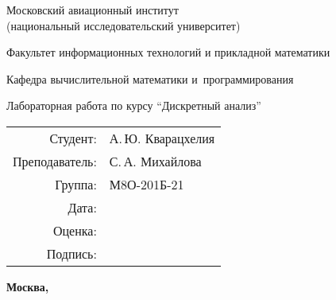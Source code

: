 \begin{titlepage}
\begin{center}
\bfseries

{\Large Московский авиационный институт\\ (национальный исследовательский университет)

}

\vspace{48pt}

{\large Факультет информационных технологий и прикладной математики
}

\vspace{36pt}

{\large Кафедра вычислительной математики и~программирования

}


\vspace{48pt}

Лабораторная работа  по курсу \enquote{Дискретный анализ}

\end{center}

\vspace{72pt}

\begin{flushright}
\begin{tabular}{rl}
Студент: & А.\,Ю. Кварацхелия \\
Преподаватель: & С.\,А. Михайлова \\
Группа: & М8О-201Б-21 \\
Дата: & \\
Оценка: & \\
Подпись: & \\
\end{tabular}
\end{flushright}

\vfill

\begin{center}
\bfseries
Москва, \the\year
\end{center}
\end{titlepage}

\pagebreak
